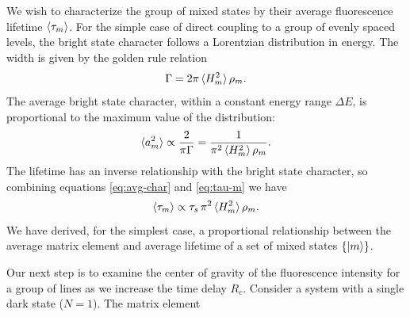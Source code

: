 \documentclass[12pt]{article}
\begin{document}
We wish to characterize the group of mixed states by their average
fluorescence lifetime $\mathinner{\langle{\tau_m}\rangle}$.  For the simple case of
direct coupling to a group of evenly spaced levels, the bright state
character follows a Lorentzian distribution in energy.  The width is
given by the golden rule relation
\begin{equation}
  \Gamma = 2 \pi \mathinner{\langle{H_{m}^2}\rangle} \rho_m.
\end{equation}
The average bright state character, within a constant energy range
$\Delta E$, is proportional to the maximum value of the distribution:
\begin{equation}
  \label{eq:avg-char}
  \mathinner{\langle{a_m^2}\rangle} \propto \frac{2}{\pi \Gamma} 
                = \frac{1}{\pi^2 \mathinner{\langle{H_{m}^2}\rangle} \rho_m}.
\end{equation}
The lifetime has an inverse relationship with the bright state
character, so combining equations \ref{eq:avg-char} and \ref{eq:tau-m}
we have
\begin{equation}
  \mathinner{\langle{\tau_m}\rangle} \propto \tau_s \, \pi^2 \mathinner{\langle{H_{m}^2}\rangle} \rho_m.
\end{equation}
We have derived, for the simplest case, a proportional relationship
between the average matrix element and average lifetime of a
set of mixed states $\lbrace\mathinner{|{m}\rangle}\rbrace$.

Our next step is to examine the center of gravity of the fluorescence
intensity for a group of lines as we increase the time delay $R_c$.
Consider a system with a single dark state ($N=1$).  The matrix
element 
\end{document}
